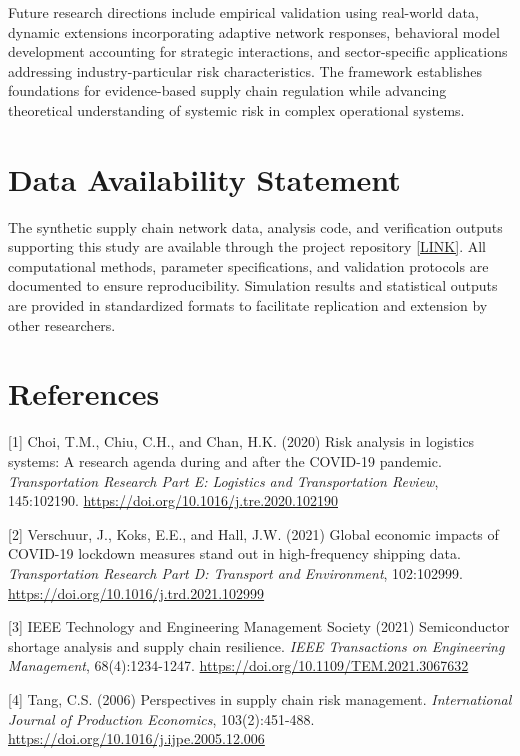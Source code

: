 \documentclass[a4 paper, 11pt,twoside]{article}
\newcommand{\0}{\Bf{0}}
\theoremstyle{definition}
\begin{document}
Future research directions include empirical validation using real-world data, dynamic extensions incorporating adaptive network responses, behavioral model development accounting for strategic interactions, and sector-specific applications addressing industry-particular risk characteristics. The framework establishes foundations for evidence-based supply chain regulation while advancing theoretical understanding of systemic risk in complex operational systems.

\section*{Data Availability Statement}

The synthetic supply chain network data, analysis code, and verification outputs supporting this study are available through the project repository \href{https://github.com/omoshola-o/urlnetwork_analysis_supply_chain}{[LINK]}. All computational methods, parameter specifications, and validation protocols are documented to ensure reproducibility. Simulation results and statistical outputs are provided in standardized formats to facilitate replication and extension by other researchers.

\section*{References}
\label{ref1}[1] Choi, T.M., Chiu, C.H., and Chan, H.K. (2020) Risk analysis in logistics systems: A research agenda during and after the COVID-19 pandemic. \emph{Transportation Research Part E: Logistics and Transportation Review}, 145:102190. \href{https://doi.org/10.1016/j.tre.2020.102190}{https://doi.org/10.1016/j.tre.2020.102190}

\label{ref2}[2] Verschuur, J., Koks, E.E., and Hall, J.W. (2021) Global economic impacts of COVID-19 lockdown measures stand out in high-frequency shipping data. \emph{Transportation Research Part D: Transport and Environment}, 102:102999. \href{https://doi.org/10.1016/j.trd.2021.102999}{https://doi.org/10.1016/j.trd.2021.102999}

\label{ref3}[3] IEEE Technology and Engineering Management Society (2021) Semiconductor shortage analysis and supply chain resilience. \emph{IEEE Transactions on Engineering Management}, 68(4):1234-1247. \href{https://doi.org/10.1109/TEM.2021.3067632}{https://doi.org/10.1109/TEM.2021.3067632}

\label{ref4}[4] Tang, C.S. (2006) Perspectives in supply chain risk management. \emph{International Journal of Production Economics}, 103(2):451-488. \href{https://doi.org/10.1016/j.ijpe.2005.12.006}{https://doi.org/10.1016/j.ijpe.2005.12.006}
\end{document}
